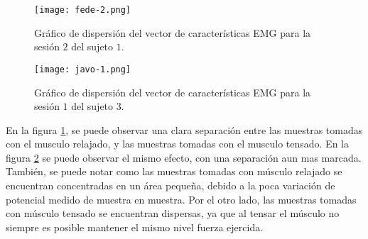  \begin{figure}[H]
	\centering
    \texttt{[image: fede-2.png]}
    \caption{Gráfico de dispersión del vector de características EMG para la sesión $2$ del sujeto $1$.}
	\label{fig:emg-graph-s1s2}
\end{figure}

 \begin{figure}[H]
	\centering
    \texttt{[image: javo-1.png]}
    \caption{Gráfico de dispersión del vector de características EMG para la sesión $1$ del sujeto $3$.}
	\label{fig:emg-graph-s3s1}
\end{figure}

En la figura \ref{fig:emg-graph-s1s2}, se puede observar una clara separación entre las muestras tomadas con el musculo relajado, y las muestras tomadas con el musculo tensado. En la figura \ref{fig:emg-graph-s3s1} se puede observar el mismo efecto, con una separación aun mas marcada. También, se puede notar como las muestras tomadas con músculo relajado se encuentran concentradas en un área pequeña, debido a la poca variación de potencial medido de muestra en muestra. Por el otro lado, las muestras tomadas con músculo tensado se encuentran dispersas, ya que al tensar el músculo no siempre es posible mantener el mismo nivel fuerza ejercida.